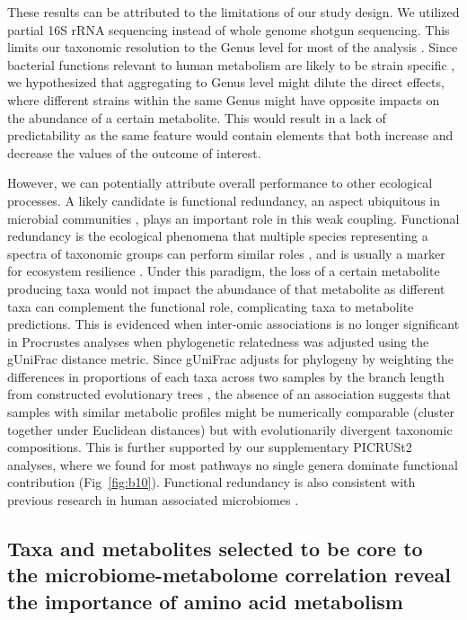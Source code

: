 These results can be attributed to the limitations of our study design. We utilized partial 16S rRNA sequencing instead of whole genome shotgun sequencing. This limits our taxonomic resolution to the Genus level for most of the analysis \cite{johnson2019evaluation}. Since bacterial functions relevant to human metabolism are likely to be strain specific \cite{zhang2016strainlevel, lloyd-price2017strains}, we hypothesized that aggregating to Genus level might dilute the direct effects, where different strains within the same Genus might have opposite impacts on the abundance of a certain metabolite. This would result in a lack of predictability as the same feature would contain elements that both increase and decrease the values of the outcome of interest.  

However, we can potentially attribute overall performance to other ecological processes. A likely candidate is functional redundancy, an aspect ubiquitous in microbial communities \cite{louca2018function}, plays an important role in this weak coupling. Functional redundancy is the ecological phenomena that multiple species representing a spectra of taxonomic groups can perform similar roles \cite{louca2018function, vieira-silva2016species}, and is usually a marker for ecosystem resilience \cite{allison2008resistance}. Under this paradigm, the loss of a certain metabolite producing taxa would not impact the abundance of that metabolite as different taxa can complement the functional role, complicating taxa to metabolite predictions. This is evidenced when inter-omic associations is no longer significant in Procrustes analyses when phylogenetic relatedness was adjusted using the gUniFrac distance metric. Since gUniFrac adjusts for phylogeny by weighting the differences in proportions of each taxa across two samples by the branch length from constructed evolutionary trees \cite{chen2012associating}, the absence of an association suggests that samples with similar metabolic profiles might be numerically comparable (cluster together under Euclidean distances) but with evolutionarily divergent taxonomic compositions. This is further supported by our supplementary PICRUSt2 analyses, where we found for most pathways no single genera dominate functional contribution (Fig~\ref{fig:b10}). Functional redundancy is also consistent with previous research in human associated microbiomes \cite{lozupone2012diversity}. 

\subsection{Taxa and metabolites selected to be core to the microbiome-metabolome correlation reveal the importance of amino acid metabolism}  

